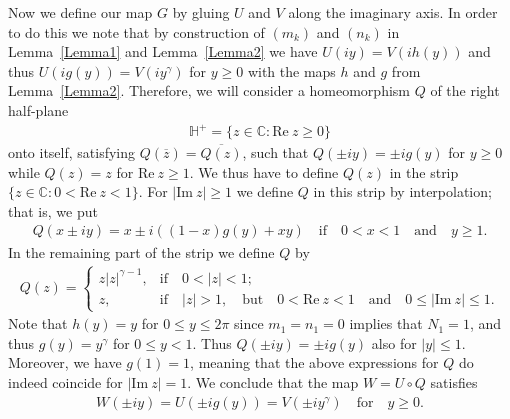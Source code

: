 \documentclass[12pt]{amsart}
\numberwithin{equation}{section}
\begin{document}
Now we define our map $G$ by gluing $U$ and $V$ along the imaginary axis. In order to do this we note that by construction of $(m_k)$ and $(n_k)$ in Lemma~\ref{Lemma1} and Lemma~\ref{Lemma2} we have $U(iy)=V(ih(y))$ and thus $U(ig(y))=V(iy^{\gamma})$ for $y\geq 0$ with the maps $h$ and $g$ from Lemma~\ref{Lemma2}. Therefore, we will consider a homeomorphism $Q$ of the right half-plane
\begin{equation*}
\begin{split}
\mathbb{H}^{+}=\{z\in\mathbb{C}:\text{Re}\ z\geq 0\}
\end{split}
\end{equation*}
onto itself, satisfying $Q(\overline{z})=\overline{Q(z)}$, such that $Q(\pm iy)=\pm ig(y)$ for $y\geq 0$ while $Q(z)=z$ for $\text{Re}\ z\geq 1$. We thus have to define $Q(z)$ in the strip $\{z\in\mathbb{C}:0<\text{Re}\ z<1\}$. For $|\text{Im}\ z|\geq 1$ we define $Q$ in this strip by interpolation; that is, we put
\begin{equation*}
\begin{split}
Q(x\pm iy)=x\pm i((1-x)g(y)+xy)  \quad
 \text{if} \quad 0<x<1 \quad \text{and} \quad y\geq 1.
\end{split}
\end{equation*}
In the remaining part of the strip we define $Q$ by
\begin{equation*}
\begin{split}
Q(z)=\left\{
       \begin{array}{ll}
         z|z|^{\gamma-1}, & \text{if} \quad 0<|z|<1; \\
         z,               & \text{if} \quad |z|>1, \quad \text{but} \quad  0<\text{Re}\ z<1 \quad \text{and} \quad 0\leq |\text{Im}\ z|\leq 1.
       \end{array}
     \right.
\end{split}
\end{equation*}
Note that $h(y)=y$ for $0\leq y\leq 2\pi$ since $m_1=n_1=0$ implies that $N_1=1$, and thus $g(y)=y^{\gamma}$ for $0\leq y<1$. Thus $Q(\pm i y)=\pm ig(y)$ also for $|y|\leq 1$. Moreover, we have $g(1)=1$, meaning that the above expressions for $Q$ do indeed coincide for $|\text{Im}\ z|=1$. We conclude that the map $W=U\circ Q$ satisfies
\begin{equation*}
\begin{split}
W(\pm iy)=U(\pm ig(y))=V(\pm iy^{\gamma}) \quad \text{for} \quad y\geq 0.
\end{split}
\end{equation*}
\end{document}
